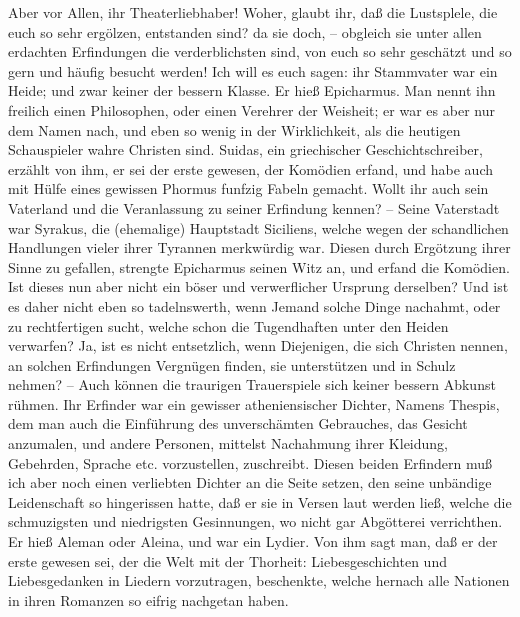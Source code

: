 \medskip

Aber vor Allen, ihr Theaterliebhaber! Woher, glaubt ihr,
daß die Lustsplele, die
euch so sehr ergölzen, entstanden sind? da sie doch, -- obgleich sie unter allen
erdachten Erfindungen die verderblichsten sind, von euch so sehr geschätzt und
so gern und häufig besucht werden! Ich will es euch sagen: ihr Stammvater war
ein Heide; und zwar keiner der bessern Klasse. Er hieß
Epicharmus. Man nennt ihn
freilich einen Philosophen, oder einen Verehrer der Weisheit;
er war es aber nur
dem Namen nach, und eben so wenig in der Wirklichkeit, als die heutigen
Schauspieler wahre Christen sind. Suidas, ein
griechischer Geschichtschreiber,
erzählt von ihm, er sei der erste gewesen, der Komödien erfand, und habe auch
mit Hülfe eines gewissen Phormus funfzig Fabeln
gemacht. Wollt ihr auch sein
Vaterland und die Veranlassung zu seiner Erfindung kennen? -- Seine Vaterstadt
war Syrakus, die (ehemalige) Hauptstadt
Siciliens, welche wegen der schandlichen
Handlungen vieler ihrer Tyrannen merkwürdig war. Diesen durch Ergötzung ihrer
Sinne zu gefallen, strengte Epicharmus seinen Witz
an, und erfand die Komödien.
Ist dieses nun aber nicht ein böser und verwerflicher Ursprung derselben? Und
ist es daher nicht eben so tadelnswerth, wenn Jemand solche Dinge nachahmt, oder
zu rechtfertigen sucht, welche schon die Tugendhaften unter den Heiden
verwarfen? Ja, ist es nicht entsetzlich, wenn Diejenigen, die sich Christen
nennen, an solchen Erfindungen Vergnügen finden, sie unterstützen und in Schulz
nehmen? -- Auch können die traurigen Trauerspiele sich keiner bessern Abkunst
rühmen. Ihr Erfinder war ein gewisser atheniensischer Dichter, Namens
Thespis, dem man auch die Einführung des unverschämten
Gebrauches, das Gesicht anzumalen,
und andere Personen, mittelst Nachahmung ihrer Kleidung, Gebehrden, Sprache etc.
vorzustellen, zuschreibt. Diesen beiden Erfindern muß ich aber noch einen
verliebten Dichter an die Seite setzen, den seine unbändige Leidenschaft so
hingerissen hatte, daß er sie in Versen laut werden ließ, welche die
schmuzigsten und niedrigsten Gesinnungen, wo nicht gar Abgötterei verrichthen.
Er hieß Aleman oder Aleina, und
war ein Lydier. Von ihm sagt man, daß er der
erste gewesen sei, der die Welt mit der Thorheit: Liebesgeschichten und
Liebesgedanken in Liedern vorzutragen, beschenkte, welche hernach alle Nationen
in ihren Romanzen so eifrig nachgetan haben.

